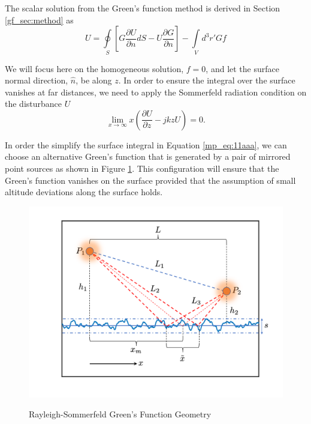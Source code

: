 The scalar solution from the Green's function method is derived in Section \ref{gf_sec:method} as
\begin{equation}
U = \oint\limits_{S}\left[G\frac{\partial U}{\partial n}dS - U\frac{\partial G}{\partial n} \right] -\int\limits_{V}d^3r' Gf
\label{mp_eq:11aaa}
\end{equation}
\renewcommand{\baselinestretch}{2} \small\normalsize

We will focus here on the homogeneous solution, $f=0$, and let the surface normal direction, $\hat{n}$, be along $z$. In order to ensure the integral over the surface vanishes at far distances, we need to apply the Sommerfeld radiation condition on the disturbance $U$
\begin{equation}
 \lim_{x\to\infty} x\left(\frac{\partial U}{\partial z} -jkzU \right) = 0.
\label{mp_eq:11aaaa}
\end{equation}
\renewcommand{\baselinestretch}{2} \small\normalsize

In order the simplify the surface integral in Equation \ref{mp_eq:11aaa}, we can choose an alternative Green's function that is generated by a pair of mirrored point sources as shown in Figure \ref{mp_fig:2a}. This configuration will ensure that the Green's function vanishes on the surface provided that the assumption of small altitude deviations along the surface holds.

\begin{figure}[H]
  \begin{center}
\includegraphics[width=5in]{../media/analysis/multipath_layout.png}
  \end{center}
  \renewcommand{\baselinestretch}{1} \small\normalsize
  \begin{quote}
    \caption[Rayleigh-Sommerfeld Green's Function Geometry]{Rayleigh-Sommerfeld Green's Function Geometry\label{mp_fig:2a}}
  \end{quote}
\end{figure}
\renewcommand{\baselinestretch}{2} \small\normalsize

